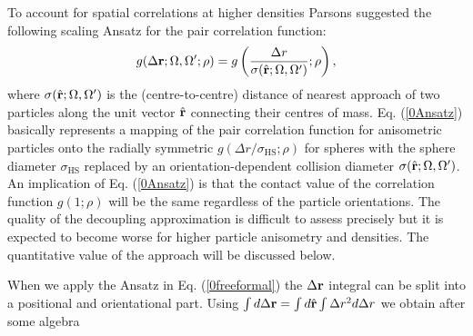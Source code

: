 \documentclass[amssymb]{revtex4}
\newcommand{\bfr}{{\bf r}}
\begin{document}
To account for spatial correlations at higher densities 
Parsons suggested the following scaling Ansatz for the pair correlation function:
\begin{equation}
g(\Delta\bfr;\Omega,\Omega^{\prime};\rho)=g\left(\frac{\Delta r}{\sigma(\hat{\bfr};\Omega,\Omega^{\prime})};\rho\right), 
\label{0Ansatz}
\end{equation}
where $\sigma(\hat{\bfr};\Omega,\Omega^{\prime})$ is the (centre-to-centre) distance of nearest 
approach of two particles along the unit vector $\hat{\bfr}$ connecting their centres of
mass. 
Eq. (\ref{0Ansatz}) basically represents a mapping of the pair correlation function
for anisometric particles onto the radially symmetric $g(\Delta r/\sigma_{\text{HS}};\rho)$ for spheres with the sphere 
diameter $\sigma_{\text{HS}}$
replaced by an orientation-dependent collision diameter $\sigma(\hat{\bfr};\Omega,\Omega^{\prime})$.
An implication of Eq. (\ref{0Ansatz}) is that the contact value of the correlation function $g(1;\rho)$ will be the same regardless 
of the particle orientations.  
The quality of the  decoupling approximation is difficult to assess precisely but
it is expected to become worse for higher particle anisometry and densities.
The quantitative value of the approach will be discussed below.

When we apply the Ansatz in Eq. (\ref{0freeformal}) 
the $\Delta \bfr$ integral can be split  into  a positional and orientational part.
Using  $\int d \Delta \bfr = \int d \hat{\bfr}\int \Delta r^{2}d\Delta r$ we obtain
after some algebra
																											
\end{document}
